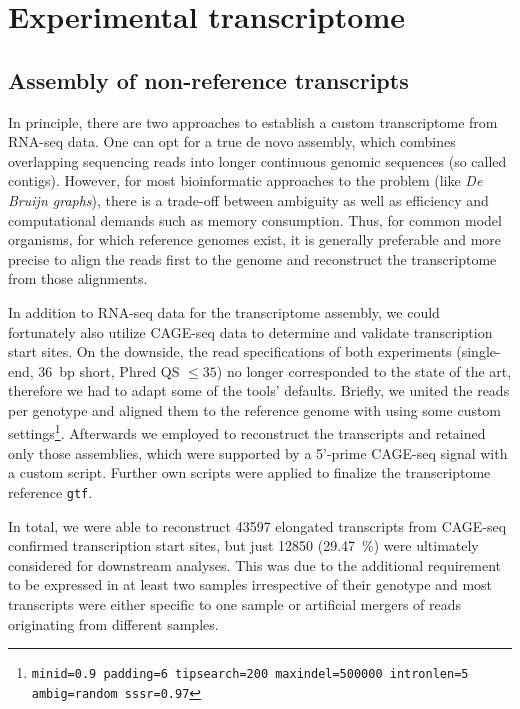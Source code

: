 \chapter{Experimental transcriptome}
\label{chap:r:tinats}

\section{Assembly of non-reference transcripts}
\label{chap:r:tinats:stringtie}

In principle, there are two approaches to establish a custom transcriptome from RNA-seq data. One can opt for a true de novo assembly\cite{Haas2013}, which combines overlapping sequencing reads into longer continuous genomic sequences (so called contigs). However, for most bioinformatic approaches to the problem (like \emph{De Bruijn graphs}), there is a trade-off between ambiguity as well as efficiency and computational demands such as memory consumption. Thus, for common model organisms, for which reference genomes exist, it is generally preferable and more precise to align the reads first to the genome and reconstruct the transcriptome from those alignments\cite{Liao2013,Liao2014,Maretty2014}. 

In addition to RNA-seq data for the transcriptome assembly, we could fortunately also utilize CAGE-seq data to determine and validate transcription start sites. On the downside, the read specifications of both experiments (single-end, \SI{36}{bp} short, Phred QS $\leq 35$) no longer corresponded to the state of the art, therefore we had to adapt some of the tools' defaults. Briefly, we united the reads per genotype and aligned them to the \mmnine reference genome with \cite{Bushnell2014} using some custom settings\footnote{\texttt{minid=0.9 padding=6 tipsearch=200 maxindel=500000 intronlen=5 ambig=random sssr=0.97}}. Afterwards we employed \cite{Pertea2015} to reconstruct the transcripts and retained only those assemblies, which were supported by a 5'-prime CAGE-seq signal with a custom script. Further own  scripts were applied to finalize the transcriptome reference \verb|gtf|. 

In total, we were able to reconstruct \num{43597} elongated transcripts from CAGE-seq confirmed transcription start sites, but just \num{12850} (\SI{29.47}{\percent}) were ultimately considered for downstream analyses. This was due to the additional requirement to be expressed in at least two samples irrespective of their genotype and most transcripts were either specific to one sample or artificial mergers of reads originating from different samples. 

